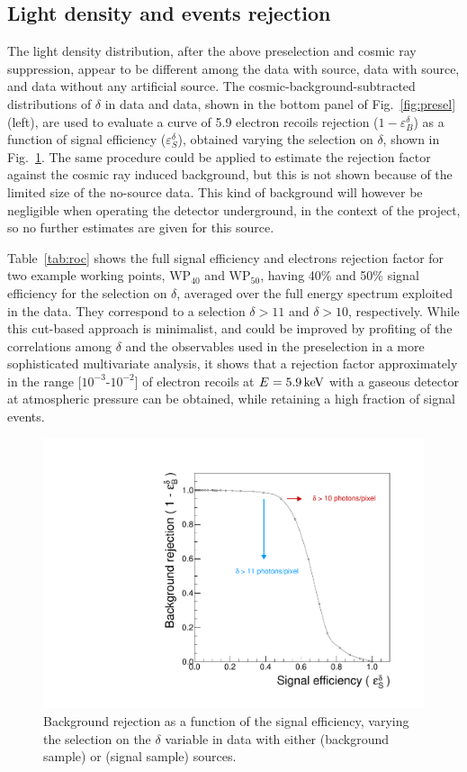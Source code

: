 \subsection{Light density and  \fe events rejection}
The light density distribution, after the above preselection and
cosmic ray suppression, appear to be different among the data
with \ambe source, data with \fe source, and data without any
artificial source.  The cosmic-background-subtracted distributions of
$\delta$ in \ambe data and \fe data, shown in the bottom panel of
Fig.~\ref{fig:presel} (left), are used to evaluate a curve of 5.9\keV
electron recoils rejection ($1-\varepsilon^\delta_{B}$) as a function
of signal efficiency ($\varepsilon^\delta_{S}$), obtained varying the
selection on $\delta$, shown in Fig.~\ref{fig:roc}.  The same
procedure could be applied to estimate the rejection factor against
the cosmic ray induced background, but this is not shown because of
the limited size of the no-source data. This kind of background will
however be negligible when operating the detector underground, in the
context of the \cygno project, so no further estimates are given for
this source.

Table~\ref{tab:roc} shows the full signal efficiency and electrons
rejection factor for two example working points, $\mathrm{WP}_{40}$
and $\mathrm{WP}_{50}$, having 40\% and 50\% signal efficiency for the
selection on $\delta$, averaged over the full energy spectrum
exploited in the \ambe data. They correspond to a selection
$\delta>11$ and $\delta>10$, respectively.  While this cut-based
approach is minimalist, and could be improved by profiting of the
correlations among $\delta$ and the observables used in the
preselection in a more sophisticated multivariate analysis, it shows
that a rejection factor approximately in the range
[$10^{-3}$-$10^{-2}$] of electron recoils at $E=5.9\,\textrm{ke\hspace{-.08em}V}$ with a
gaseous detector at atmospheric pressure can be obtained, while
retaining a high fraction of signal events.
%
\begin{figure}[ht]
  \begin{center}
  \includegraphics[width=0.45\linewidth]{figures/density_roc}

  \caption{Background rejection as a function of the signal
    efficiency, varying the selection on the $\delta$ variable in data
    with either \fe (background sample) or \ambe (signal sample)
    sources.  \label{fig:roc}}

  \end{center}
\end{figure}
%



